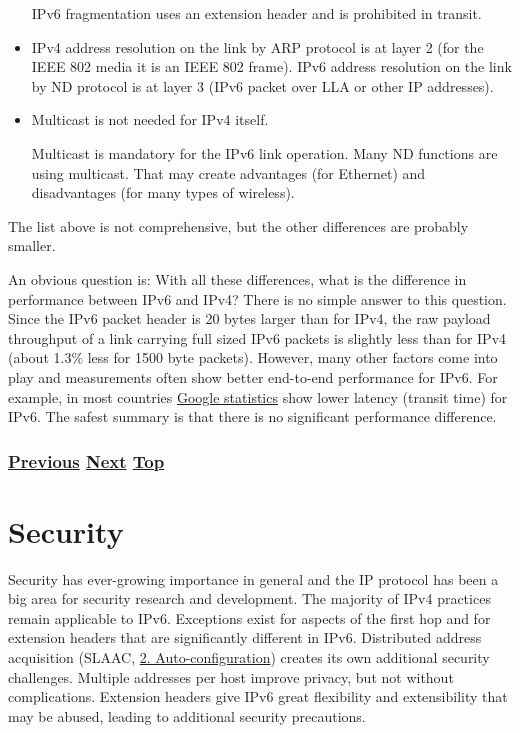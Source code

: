 \documentclass[
]{article}
\begin{document}
\begin{itemize}
  IPv6 fragmentation uses an extension header and is prohibited in
  transit.
\item
  IPv4 address resolution on the link by ARP protocol is at layer 2 (for
  the IEEE 802 media it is an IEEE 802 frame). IPv6 address resolution
  on the link by ND protocol is at layer 3 (IPv6 packet over LLA or
  other IP addresses).
\item
  Multicast is not needed for IPv4 itself.

  Multicast is mandatory for the IPv6 link operation. Many ND functions
  are using multicast. That may create advantages (for Ethernet) and
  disadvantages (for many types of wireless).
\end{itemize}

The list above is not comprehensive, but the other differences are
probably smaller.

An obvious question is: With all these differences, what is the
difference in performance between IPv6 and IPv4? There is no simple
answer to this question. Since the IPv6 packet header is 20 bytes larger
than for IPv4, the raw payload throughput of a link carrying full sized
IPv6 packets is slightly less than for IPv4 (about 1.3\% less for 1500
byte packets). However, many other factors come into play and
measurements often show better end-to-end performance for IPv6. For
example, in most countries
\href{https://www.google.com/intl/en/ipv6/statistics.html\#tab=per-country-ipv6-adoption}{Google
statistics} show lower latency (transit time) for IPv6. The safest
summary is that there is no significant performance difference.

\subsubsection{\texorpdfstring{\hyperref[obsolete-techniques]{Previous}
\hyperref[security]{Next}
\hyperref[coexistence-with-legacy-ipv4]{Top}}{Previous Next Top}}\label{previous-next-top-22}

\pagebreak

\section{Security}\label{security}

Security has ever-growing importance in general and the IP protocol has
been a big area for security research and development. The majority of
IPv4 practices remain applicable to IPv6. Exceptions exist for aspects
of the first hop and for extension headers that are significantly
different in IPv6. Distributed address acquisition (SLAAC,
\hyperref[auto-configuration]{2. Auto-configuration}) creates its own
additional security challenges. Multiple addresses per host improve
privacy, but not without complications. Extension headers give IPv6
great flexibility and extensibility that may be abused, leading to
additional security precautions.
\end{document}
